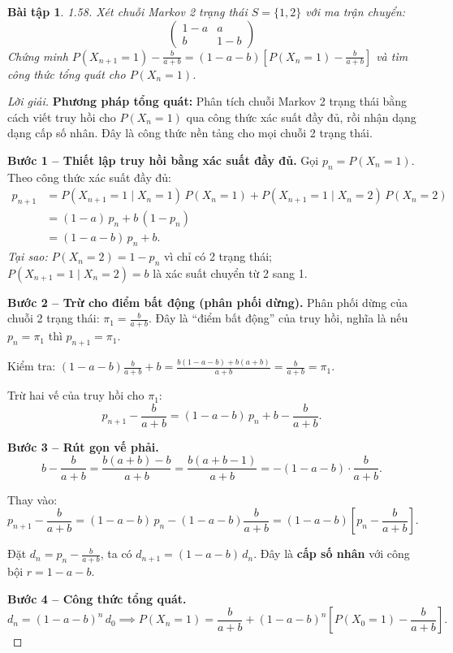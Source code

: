 \documentclass[8pt,a4paper]{article}
\newtheorem{exercise}{Bài tập}
\newenvironment{solution}{\begin{proof}[Lời giải]}{\end{proof}}
\begin{document}
\begin{exercise}
1.58. Xét chuỗi Markov 2 trạng thái $S=\{1, 2\}$ với ma trận chuyển:
\[
\begin{pmatrix}
1-a & a \\
b & 1-b
\end{pmatrix}
\]
Chứng minh $P(X_{n+1}=1) - \frac{b}{a+b} = (1-a-b)[P(X_n=1) - \frac{b}{a+b}]$ và tìm công thức tổng quát cho $P(X_n=1)$.
\end{exercise}
\begin{solution}
\textbf{Phương pháp tổng quát:} Phân tích chuỗi Markov 2 trạng thái bằng cách viết truy hồi cho $P(X_n = 1)$ qua công thức xác suất đầy đủ, rồi nhận dạng dạng cấp số nhân. Đây là công thức nền tảng cho mọi chuỗi 2 trạng thái.

\textbf{Bước 1 -- Thiết lập truy hồi bằng xác suất đầy đủ.}
Gọi $p_n = P(X_n = 1)$. Theo công thức xác suất đầy đủ:
\begin{align*}
  p_{n+1} &= P(X_{n+1}=1 \mid X_n=1)\, P(X_n=1) + P(X_{n+1}=1 \mid X_n=2)\, P(X_n=2) \\
           &= (1-a)\, p_n + b\,(1-p_n) \\
           &= (1-a-b)\, p_n + b.
\end{align*}
\textit{Tại sao:} $P(X_n=2) = 1 - p_n$ vì chỉ có 2 trạng thái; $P(X_{n+1}=1 \mid X_n=2) = b$ là xác suất chuyển từ 2 sang 1.

\textbf{Bước 2 -- Trừ cho điểm bất động (phân phối dừng).}
Phân phối dừng của chuỗi 2 trạng thái: $\pi_1 = \frac{b}{a+b}$. Đây là ``điểm bất động'' của truy hồi, nghĩa là nếu $p_n = \pi_1$ thì $p_{n+1} = \pi_1$.

Kiểm tra: $(1-a-b)\frac{b}{a+b} + b = \frac{b(1-a-b) + b(a+b)}{a+b} = \frac{b}{a+b} = \pi_1$. \checkmark

Trừ hai vế của truy hồi cho $\pi_1$:
\[
  p_{n+1} - \frac{b}{a+b} = (1-a-b)\, p_n + b - \frac{b}{a+b}.
\]

\textbf{Bước 3 -- Rút gọn vế phải.}
\[
  b - \frac{b}{a+b} = \frac{b(a+b) - b}{a+b} = \frac{b(a+b-1)}{a+b} = -(1-a-b) \cdot \frac{b}{a+b}.
\]

Thay vào:
\[
  p_{n+1} - \frac{b}{a+b} = (1-a-b)\, p_n - (1-a-b)\frac{b}{a+b} = (1-a-b)\left[p_n - \frac{b}{a+b}\right].
\]

Đặt $d_n = p_n - \frac{b}{a+b}$, ta có $d_{n+1} = (1-a-b)\, d_n$. Đây là \textbf{cấp số nhân} với công bội $r = 1-a-b$.

\textbf{Bước 4 -- Công thức tổng quát.}
\[
  d_n = (1-a-b)^n \, d_0 \implies \boxed{P(X_n = 1) = \frac{b}{a+b} + (1-a-b)^n \left[P(X_0=1) - \frac{b}{a+b}\right]}.
\]


\end{solution}
\end{document}
